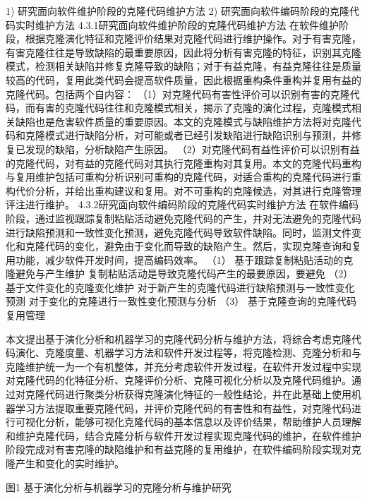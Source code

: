 1)	研究面向软件维护阶段的克隆代码维护方法
2)	研究面向软件编码阶段的克隆代码实时维护方法
4.3.1研究面向软件维护阶段的克隆代码维护方法
在软件维护阶段，根据克隆演化特征和克隆评价结果对克隆代码进行维护操作。对于有害克隆，有害克隆往往是导致缺陷的最重要原因，因此将分析有害克隆的特征，识别其克隆模式，检测相关缺陷并修复克隆导致的缺陷；对于有益克隆，有益克隆往往是质量较高的代码，复用此类代码会提高软件质量，因此根据重构条件重构并复用有益的克隆代码。包括两个自内容：
（1）对克隆代码有害性评价可以识别有害的克隆代码，而有害的克隆代码往往和克隆模式相关，揭示了克隆的演化过程，克隆模式相关缺陷也是危害软件质量的重要原因。本文的克隆模式与缺陷维护方法将对克隆代码和克隆模式进行缺陷分析，对可能或者已经引发缺陷进行缺陷识别与预测，并修复已发现的缺陷，分析缺陷产生原因。
（2）对克隆代码有益性评价可以识别有益的克隆代码，对有益的克隆代码对其执行克隆重构对其复用。本文的克隆代码重构与复用维护包括可重构分析识别可重构的克隆代码，对适合重构的克隆代码进行重构代价分析，并给出重构建议和复用。对不可重构的克隆候选，对其进行克隆管理评注进行维护。
4.3.2研究面向软件编码阶段的克隆代码实时维护方法
在软件编码阶段，通过监视跟踪复制粘贴活动避免克隆代码的产生，并对无法避免的克隆代码进行缺陷预测和一致性变化预测，避免克隆代码导致软件缺陷。同时，监测文件变化和克隆代码的变化，避免由于变化而导致的缺陷产生。然后，实现克隆查询和复用功能，减少软件开发时间，提高编码效率。
（1）	基于跟踪复制粘贴活动的克隆避免与产生维护
复制粘贴活动是导致克隆代码产生的最要原因，要避免
（2）	基于文件变化的克隆变化维护
对于新产生的克隆代码进行缺陷预测与一致性变化预测
对于变化的克隆进行一致性变化预测与分析
（3）	基于克隆查询的克隆代码复用管理


本文提出基于演化分析和机器学习的克隆代码分析与维护方法，将综合考虑克隆代码演化、克隆度量、机器学习方法和软件开发过程等，将克隆检测、克隆分析和与克隆维护统一为一个有机整体，并充分考虑软件开发过程，在软件开发过程中实现对克隆代码的化特征分析、克隆评价分析、克隆可视化分析以及克隆代码维护。通过对克隆代码进行聚类分析获得克隆演化特征的一般性结论，并在此基础上使用机器学习方法提取重要克隆代码，并评价克隆代码的有害性和有益性，对克隆代码进行可视化分析，能够可视化克隆代码的基本信息以及评价结果，帮助维护人员理解和维护克隆代码，结合克隆分析与软件开发过程实现克隆代码的维护，在软件维护阶段完成对有害克隆的缺陷维护和有益克隆的复用维护，在软件编码阶段实现对克隆产生和变化的实时维护。

图1 基于演化分析与机器学习的克隆分析与维护研究

